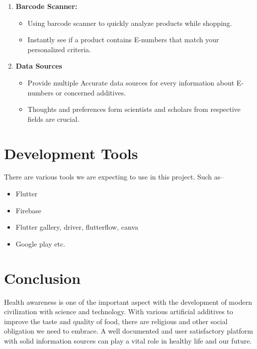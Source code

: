 \documentclass[a4paper,12pt]{report}
\begin{document}
\begin{enumerate}
\begin{itemize}
	      \end{itemize}
	\item {\bfseries Barcode Scanner:}
	      \begin{itemize}
		      \item Using barcode scanner to quickly analyze products while shopping.
		      \item Instantly see if a product contains E-numbers that match your personalized criteria.
	      \end{itemize}
	\item {\bfseries Data Sources}
	      \begin{itemize}
		      \item Provide multiple Accurate data sources for every information about E-numbers or concerned additives.
		      \item Thoughts and preferences form scientists and scholars from respective fields are crucial.
	      \end{itemize}
\end{enumerate}

\section*{Development Tools}
There are various tools we are expecting to use in this project. Such as--
\begin{itemize}
	\item Flutter
	\item Firebase
	\item Flutter gallery, driver, flutterflow, canva
	\item Google play etc.
\end{itemize}
\section*{Conclusion}
Health awareness is one of the important aspect with the development of modern civilization with science and technology. With various artificial additives to improve the taste and quality of food, there are religious and other social obligation we need to embrace. A well documented and user satisfactory platform with solid information sources can play a vital role in healthy life and our future.

\renewcommand{\bibname}{\Large Bibliography}


\end{document}
